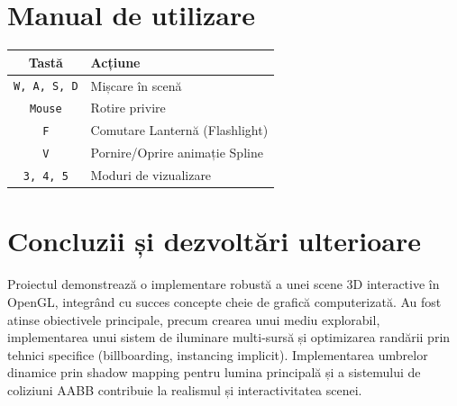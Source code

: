 \documentclass[11pt,a4paper]{article}
\begin{document}
\section{ Manual de utilizare}
\begin{table}[H]
\centering
\begin{tabular}{|c|l|}
\hline
\textbf{Tastă} & \textbf{Acțiune} \\ \hline
\texttt{W, A, S, D} & Mișcare în scenă \\ \hline
\texttt{Mouse} & Rotire privire \\ \hline
\texttt{F} & Comutare Lanternă (Flashlight) \\ \hline
\texttt{V} & Pornire/Oprire animație Spline \\ \hline
\texttt{3, 4, 5} & Moduri de vizualizare \\ \hline
\end{tabular}
\end{table}

\section{Concluzii și dezvoltări ulterioare}
Proiectul demonstrează o implementare robustă a unei scene 3D interactive în OpenGL, integrând cu succes concepte cheie de grafică computerizată. Au fost atinse obiectivele principale, precum crearea unui mediu explorabil, implementarea unui sistem de iluminare multi-sursă și optimizarea randării prin tehnici specifice (billboarding, instancing implicit). Implementarea umbrelor dinamice prin shadow mapping pentru lumina principală și a sistemului de coliziuni AABB contribuie la realismul și interactivitatea scenei.
\end{document}
